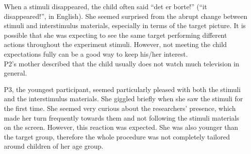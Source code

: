 When a stimuli disappeared, the child often said “det er borte!” (“it disappeared!”, in English). She seemed surprised from the abrupt change between stimuli and interstimulus materials, especially in terms of the target picture. It is possible that she was expecting to see the same target performing different actions throughout the experiment stimuli. However, not meeting the child expectations fully can be a good way to keep his/her interest.\\
P2’s mother described that the child usually does not watch much television in general.

P3, the youngest participant, seemed particularly pleased with both the stimuli and the interstimulus materials. She giggled briefly when she saw the stimuli for the first time. She seemed very curious about the researchers’ presence, which made her turn frequently towards them and not following the stimuli materials on the screen. However, this reaction was expected. She was also younger than the target group, therefore the whole procedure was not completely tailored around children of her age group.